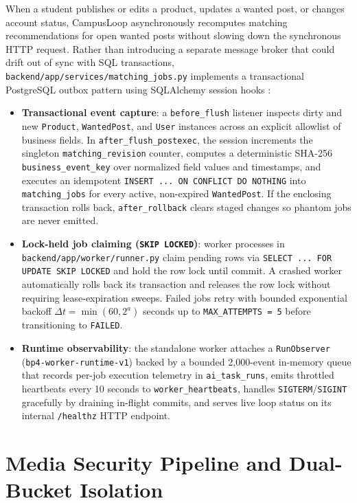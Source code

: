 When a student publishes or edits a product, updates a wanted post, or changes account status, CampusLoop asynchronously recomputes matching recommendations for open wanted posts without slowing down the synchronous HTTP request. Rather than introducing a separate message broker that could drift out of sync with SQL transactions, \texttt{backend/app/services/matching\_jobs.py} implements a transactional PostgreSQL outbox pattern using SQLAlchemy session hooks \cite{sqlalchemy20}:
\begin{itemize}
  \item \textbf{Transactional event capture}: a \texttt{before\_flush} listener inspects dirty and new \texttt{Product}, \texttt{WantedPost}, and \texttt{User} instances across an explicit allowlist of business fields. In \texttt{after\_flush\_postexec}, the session increments the singleton \texttt{matching\_revision} counter, computes a deterministic SHA-256 \texttt{business\_event\_key} over normalized field values and timestamps, and executes an idempotent \texttt{INSERT ... ON CONFLICT DO NOTHING} into \texttt{matching\_jobs} for every active, non-expired \texttt{WantedPost}. If the enclosing transaction rolls back, \texttt{after\_rollback} clears staged changes so phantom jobs are never emitted.
  \item \textbf{Lock-held job claiming (\texttt{SKIP LOCKED})}: worker processes in \texttt{backend/app/\allowbreak worker/\allowbreak runner.py} claim pending rows via \texttt{SELECT ... FOR UPDATE SKIP LOCKED} \cite{postgresExplicitLocking} and hold the row lock until commit. A crashed worker automatically rolls back its transaction and releases the row lock without requiring lease-expiration sweeps. Failed jobs retry with bounded exponential backoff $\Delta t = \min(60, 2^{a})$ seconds up to \texttt{MAX\_ATTEMPTS = 5} before transitioning to \texttt{FAILED}.
  \item \textbf{Runtime observability}: the standalone worker attaches a \texttt{RunObserver} (\texttt{bp4-worker-\allowbreak runtime-v1}) backed by a bounded 2,000-event in-memory queue that records per-job execution telemetry in \texttt{ai\_task\_runs}, emits throttled heartbeats every 10 seconds to \texttt{worker\_heartbeats}, handles \texttt{SIGTERM}/\texttt{SIGINT} gracefully by draining in-flight commits, and serves live loop status on its internal \texttt{/healthz} HTTP endpoint.
\end{itemize}

\section{Media Security Pipeline and Dual-Bucket Isolation}
\label{sec:impl-media}

